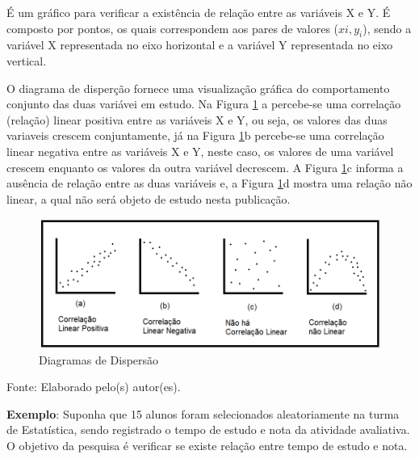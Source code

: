 \documentclass[12pt,brazil,oneside]{book}
\begin{document}
É um gráfico para verificar a existência de relação entre as variáveis X
e Y. É composto por pontos, os quais correspondem aos pares de valores
(\(xi, y_i\)), sendo a variável X representada no eixo horizontal e a
variável Y representada no eixo vertical.

O diagrama de disperção fornece uma visualização gráfica do
comportamento conjunto das duas variávei em estudo. Na Figura
\ref{fig:diag} a percebe-se uma correlação (relação) linear positiva
entre as variáveis X e Y, ou seja, os valores das duas variaveis crescem
conjuntamente, já na Figura \ref{fig:diag}b percebe-se uma correlação
linear negativa entre as variáveis X e Y, neste caso, os valores de uma
variável crescem enquanto os valores da outra variável decrescem. A
Figura \ref{fig:diag}c informa a ausência de relação entre as duas
variáveis e, a Figura \ref{fig:diag}d mostra uma relação não linear, a
qual não será objeto de estudo nesta publicação.

\begin{figure}[H]

{\centering \includegraphics[width=0.8\linewidth]{correlacao1} 

}

\caption{Diagramas de Dispersão}\label{fig:diag}
\end{figure}

Fonte: Elaborado pelo(s) autor(es).

\textbf{Exemplo}: Suponha que 15 alunos foram selecionados
aleatoriamente na turma de Estatística, sendo registrado o tempo de
estudo e nota da atividade avaliativa. O objetivo da pesquisa é
verificar se existe relação entre tempo de estudo e nota.
\end{document}
